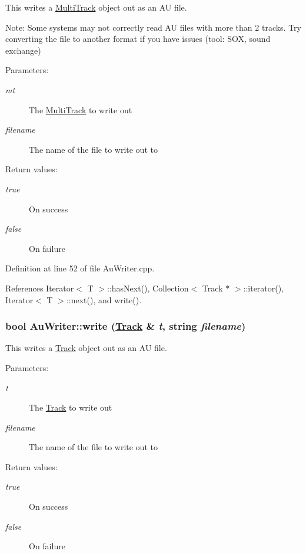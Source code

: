 This writes a \hyperlink{classMultiTrack}{Multi\-Track} object out as an AU file. \begin{Desc}
\item[Note:]Some systems may not correctly read AU files with more than 2 tracks. Try converting the file to another format if you have issues (tool: SOX, sound exchange) \end{Desc}
\begin{Desc}
\item[Parameters:]
\begin{description}
\item[{\em mt}]The \hyperlink{classMultiTrack}{Multi\-Track} to write out \item[{\em filename}]The name of the file to write out to \end{description}
\end{Desc}
\begin{Desc}
\item[Return values:]
\begin{description}
\item[{\em true}]On success \item[{\em false}]On failure \end{description}
\end{Desc}


Definition at line 52 of file Au\-Writer.cpp.

References Iterator$<$ T $>$::has\-Next(), Collection$<$ Track $\ast$ $>$::iterator(), Iterator$<$ T $>$::next(), and write().\hypertarget{classAuWriter_e1}{
\subsubsection[write]{\setlength{\rightskip}{0pt plus 5cm}bool Au\-Writer::write (\hyperlink{classTrack}{Track} \& {\em t}, string {\em filename})}}
\label{classAuWriter_e1}


This writes a \hyperlink{classTrack}{Track} object out as an AU file. \begin{Desc}
\item[Parameters:]
\begin{description}
\item[{\em t}]The \hyperlink{classTrack}{Track} to write out \item[{\em filename}]The name of the file to write out to \end{description}
\end{Desc}
\begin{Desc}
\item[Return values:]
\begin{description}
\item[{\em true}]On success \item[{\em false}]On failure \end{description}
\end{Desc}


